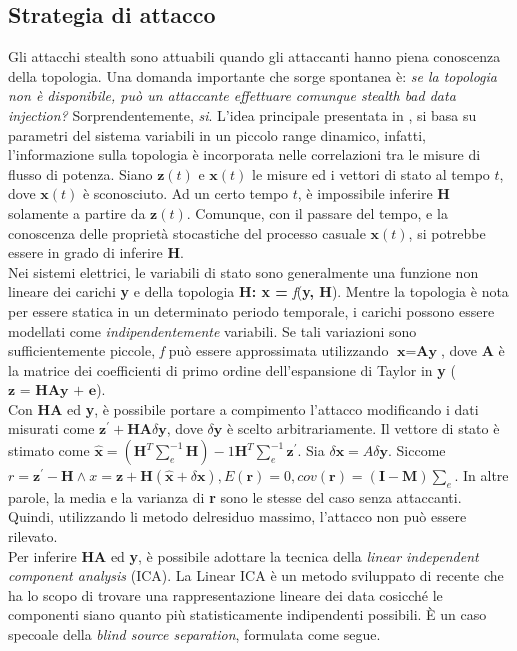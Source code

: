 \subsection{Strategia di attacco}
Gli attacchi stealth sono attuabili quando gli attaccanti hanno piena conoscenza della topologia. Una domanda importante che sorge spontanea è: \textit{se la topologia non è disponibile, può un attaccante effettuare comunque stealth bad data injection?} Sorprendentemente, \textit{si}. L'idea principale presentata in \cite{esmalifalak}, si basa su parametri del sistema variabili in un piccolo range dinamico, infatti, l'informazione sulla topologia è incorporata nelle correlazioni tra le misure di flusso di potenza. Siano $\textbf{z}(t)$ e $\textbf{x}(t)$ le misure ed i vettori di stato al tempo $t$, dove $\textbf{x}(t)$ è sconosciuto. Ad un certo tempo $t$, è impossibile inferire $\textbf{H}$ solamente a partire da $\textbf{z}(t)$. Comunque, con il passare del tempo, e la conoscenza delle proprietà stocastiche del processo casuale $\textbf{x}(t)$, si potrebbe essere in grado di inferire \textbf{H}.\\
Nei sistemi elettrici, le variabili di stato sono generalmente una funzione non lineare dei carichi \textbf{y} e della topologia \textbf{H: x = } \emph{f}(\textbf{y, H}). Mentre la topologia è nota per essere statica in un determinato periodo temporale, i carichi possono essere modellati come \textit{indipendentemente} variabili. Se tali variazioni sono sufficientemente piccole, \emph{f} può essere approssimata utilizzando $\textbf{x} = \textbf{Ay}$, dove \textbf{A} è la matrice dei coefficienti di primo ordine dell'espansione di Taylor in \textbf{y} ($\textbf{z = HAy + e}$).\\
Con \textbf{HA} ed \textbf{y}, è possibile portare a compimento l'attacco modificando i dati misurati come $\textbf{z}^\prime + \textbf{HA}\delta\textbf{y}$, dove $\delta\textbf{y}$ è scelto arbitrariamente. 
Il vettore di stato è stimato come $\widehat{\textbf{x}} = (\textbf{H}^T\sum_e^{-1}\textbf{H})-1\textbf{H}^T\sum_e^{-1}\textbf{z}^\prime$. Sia $\delta\textbf{x} = A\delta\textbf{y}$. Siccome $r = \textbf{z}^\prime - \textbf{H}\wedge x = \textbf{z} + \textbf{H}(\widehat{\textbf{x}} + \delta\textbf{x}), E(\textbf{r}) = 0, cov(\textbf{r}) = (\textbf{I} - \textbf{M})\sum_e$. In altre parole, la media e la varianza di \textbf{r} sono le stesse del caso senza attaccanti. Quindi, utilizzando li metodo delresiduo massimo, l'attacco non può essere rilevato.\\
Per inferire \textbf{HA} ed \textbf{y}, è possibile adottare la tecnica della \emph{linear independent component analysis} (ICA). La Linear ICA \cite{lica} è un metodo sviluppato di recente che ha lo scopo di trovare una rappresentazione lineare dei data cosicché le componenti siano quanto più statisticamente indipendenti possibili. È un caso specoale della \emph{blind source separation}, formulata come segue.
